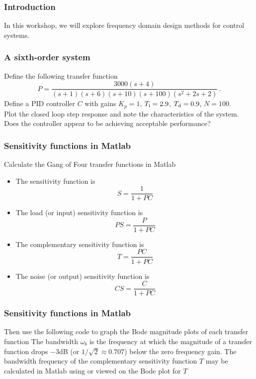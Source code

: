 \documentclass[9pt]{beamer-control}
\begin{document}

\begin{frame}
\frametitle{Introduction}
In this workshop, we will explore frequency domain design methods for control systems.
\end{frame}


\begin{frame}[fragile]
	\frametitle{A sixth-order system}
	
	Define the following transfer function
	\begin{equation}
	P = \frac{3000(s+4)}{(s+1)(s+6)(s+10)(s+100)(s^2+2s+2)} \,.
	\end{equation}
	Define a PID controller $C$ with gains $K_p=1$, $T_{\mathrm{i}}=2.9$, $T_{\mathrm{d}}=0.9$, $N=100$. \\[10pt]
	Plot the closed loop step response and note the characteristics of the system.\\[10pt]
	\alert{Does the controller appear to be achieving acceptable performance?}
	
\end{frame}

\begin{frame}[fragile]
\frametitle{Sensitivity functions in Matlab}
Calculate the Gang of Four transfer functions in Matlab
\begin{itemize}
	\item The sensitivity function is 
\begin{equation}S=\frac{1}{1+PC}\end{equation}
\item The load (or input) sensitivity function is 
\begin{equation}PS=\frac{P}{1+PC}\end{equation}
\item The complementary sensitivity function is 
\begin{equation}T=\frac{PC}{1+PC}\end{equation}
\item The noise (or output) sensitivity function is
\begin{equation}CS = \frac{C}{1+PC}\end{equation}
\end{itemize}
\end{frame}

\begin{frame}
\frametitle{Sensitivity functions in Matlab}
Then use the following code to graph the Bode magnitude plots of each transfer function
The bandwidth $\omega_b$ is the frequency at which the magnitude of a transfer function drops $-3$dB (or $1/\sqrt{2}\approx 0.707$) below the zero frequency gain. The bandwidth frequency of the complementary sensitivity function $T$ may be calculated in Matlab using
or viewed on the Bode plot for $T$
\end{frame}
\end{document}
